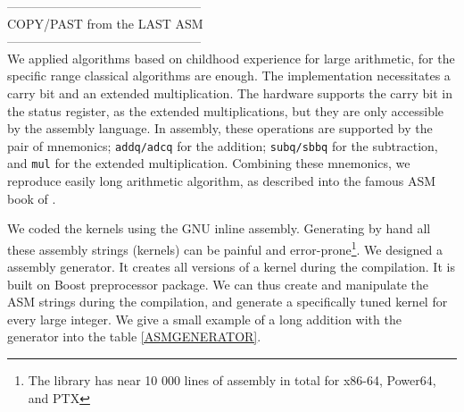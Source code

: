\documentclass[oribibl]{llncs2e/llncs}
\begin{document}
----------------------------------------------- \\
COPY/PAST from the LAST ASM\\
-----------------------------------------------\\
We applied algorithms based on childhood  experience for large arithmetic, for the specific range classical algorithms are enough.
The implementation necessitates a carry bit and an extended multiplication. The hardware supports
the carry bit in the status register, as the extended multiplications, but they are only accessible by the assembly language.
In assembly, these operations  are supported by the pair of mnemonics; \texttt{addq/adcq} for the addition; \texttt{subq/sbbq} for the subtraction, and \texttt{mul} for the extended multiplication.   
Combining these mnemonics, we reproduce easily long arithmetic algorithm, as described into the famous  ASM book of \cite{Hyde:2003:AAL:861534}. 

We coded the kernels using the GNU inline assembly.
Generating by hand all these  assembly strings (kernels)  can be painful and error-prone\footnote{The library has near 10 000 lines of assembly in total for x86-64, Power64, and PTX}.
We designed a assembly generator. It creates all versions of a kernel during the compilation.   
It is built on Boost preprocessor package. We can thus create and manipulate the ASM strings during the compilation, 
and generate a specifically tuned kernel for every large integer. We give a small example of a long addition with the generator into the table \ref{ASMGENERATOR}.
\end{document}
